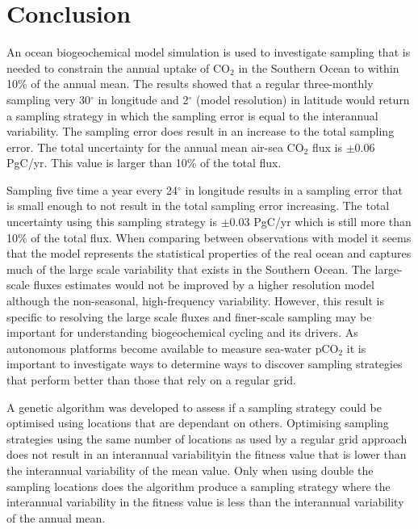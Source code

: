 \documentclass[11pt, a4paper]{article}
\numberwithin{figure}{section}
\numberwithin{table}{section}
\begin{document}
\newpage
\section{Conclusion}
An ocean biogeochemical model simulation is used to investigate
sampling that is needed to constrain the annual uptake
of CO$_2$ in the Southern Ocean to within 10\% of the annual mean. 
The results showed that a regular three-monthly sampling very 30$^\circ$
in longitude and 2$^\circ$ (model resolution) in latitude would return a sampling strategy in which the
sampling error is equal to the interannual variability. 
The sampling error does result in an increase to the total sampling error.
The total uncertainty for the annual
mean air-sea CO$_2$ flux is $\pm$0.06 PgC/yr. 
This value is larger than 10\% of the total flux.

Sampling five time a year every 24$^\circ$ in longitude results in 
a sampling error that is small enough to not result in the total sampling error
increasing. 
The total uncertainty using this sampling strategy is $\pm$0.03 PgC/yr
which is still more than 10\% of the total flux.
When comparing between observations with model it seems
that the model represents the statistical properties
of the real ocean and captures much of the large scale variability
that exists in the Southern Ocean. 
The large-scale fluxes estimates would not be improved by a higher resolution
model although the non-seasonal, high-frequency variability. 
However, this result is specific
to resolving the large scale fluxes and finer-scale sampling may be
important for understanding biogeochemical cycling and its drivers. 
As autonomous platforms become available to measure sea-water pCO$_2$ it
is important to investigate ways to determine ways to discover
sampling strategies that perform better than those that rely on a regular grid.

A genetic algorithm was developed to assess if a sampling strategy could be optimised using 
locations that are dependant on others.
Optimising sampling strategies using the same number of locations as used by a regular grid 
approach does not result in an interannual variabilityin the fitness value that is
lower than the interannual variability of the mean value. Only when using double the sampling locations
does the algorithm produce a sampling strategy where the interannual variability in the fitness
value is less than the interannual variability of the annual mean.
%

	
\end{document}

